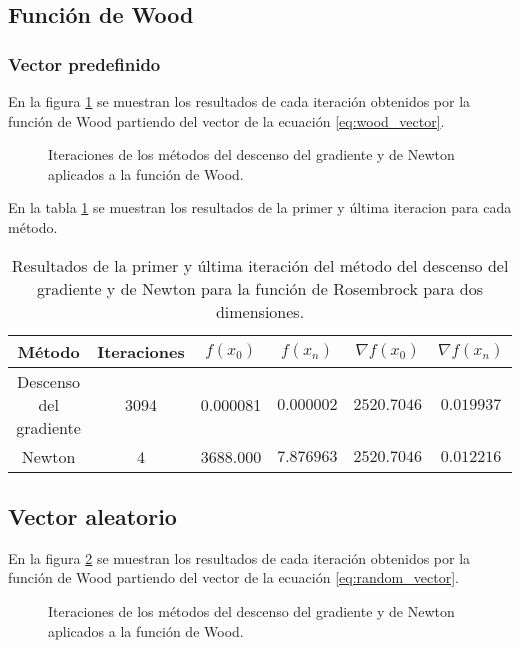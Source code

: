 
\subsection{Función de Wood}

\subsubsection{Vector predefinido}

En la figura \ref{fig:wood} se muestran los resultados de cada iteración obtenidos por la función de Wood partiendo del vector de la ecuación \ref{eq:wood_vector}.

\begin{figure}[H]
    \centering
    \caption{Iteraciones de los métodos del descenso del gradiente y de Newton aplicados a la función de Wood.}
    \label{fig:wood}
\end{figure}

En la tabla \ref{table:wood_predefined} se muestran los resultados de la primer y última iteracion para cada método.

\begin{table}[H]
    \centering
    \begin{tabular}{cccccc} \hline
        Método                 & Iteraciones & $f(x_0)$ & $f(x_n)$   & $\nabla f(x_0)$ & $\nabla f(x_n) $ \\ \hline
        Descenso del gradiente & 3094        & 0.000081 & $0.000002$ & $2520.7046$     & $0.019937$       \\
        Newton                 & 4           & 3688.000 & $7.876963$ & $2520.7046$     & $0.012216$       \\ \hline
    \end{tabular}
    \caption{Resultados de la primer y última iteración del método del descenso del gradiente y de Newton para la función de Rosembrock para dos dimensiones.}
    \label{table:wood_predefined}
\end{table}

\subsection{Vector aleatorio}

En la figura \ref{fig:wood_random} se muestran los resultados de cada iteración obtenidos por la función de Wood partiendo del vector de la ecuación \ref{eq:random_vector}.

\begin{figure}[H]
    \centering
    \caption{Iteraciones de los métodos del descenso del gradiente y de Newton aplicados a la función de Wood.}
    \label{fig:wood_random}
\end{figure}

